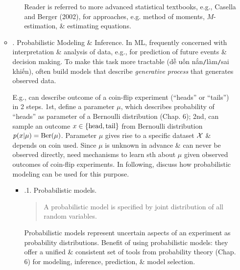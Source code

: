 \documentclass{article}
\begin{document}
\begin{itemize}
\begin{itemize}
\begin{itemize}
			 Reader is referred to more advanced statistical textbooks, e.g., Casella and Berger (2002), for approaches, e.g. method of moments, $M$-estimation, \& estimating equations.
		\end{itemize}
		\item {. Probabilistic Modeling \& Inference.} In ML, frequently concerned with interpretation \& analysis of data, e.g., for prediction of future events \& decision making. To make this task more tractable (dễ uốn nắn{\tt/}làm{\tt/}sai khiến), often build models that describe {\it generative process} that generates observed data.
		
		E.g., can describe outcome of a coin-flip experiment (``heads'' or ``tails'') in 2 steps. 1st, define a parameter $\mu$, which describes probability of ``heads'' as parameter of a Bernoulli distribution (Chap. 6); 2nd, can sample an outcome $x\in\{{\rm head, tail}\}$ from Bernoulli distribution $p(x|\mu) = {\rm Ber}(\mu)$. Parameter $\mu$ gives rise to a specific dataset ${\cal X}$ \& depends on coin used. Since $\mu$ is unknown in advance \& can never be observed directly, need mechanisms to learn sth about $\mu$ given observed outcomes of coin-flip experiments. In following, discuss how probabilistic modeling can be used for this purpose.
		\begin{itemize}
			\item {.1. Probabilistic models.}
			\begin{quote}
				A probabilistic model is specified by joint distribution of all random variables.
			\end{quote}
			Probabilistic models represent uncertain aspects of an experiment as probability distributions. Benefit of using probabilistic models: they offer a unified \& consistent set of tools from probability theory (Chap. 6) for modeling, inference, prediction, \& model selection.
			

\end{itemize}
\end{itemize}
\end{itemize}
\end{document}
